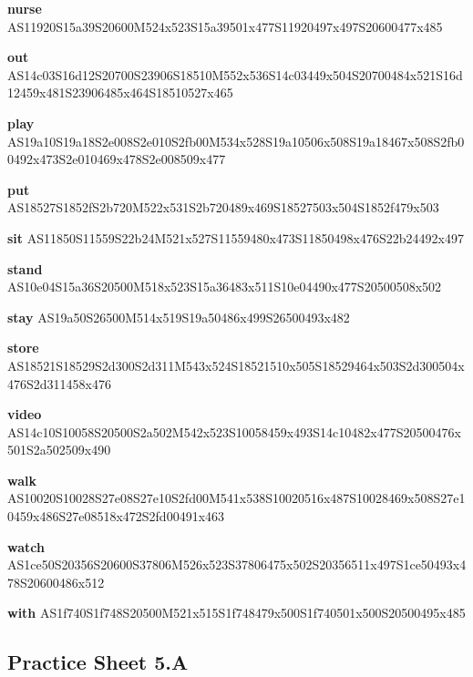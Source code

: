 \documentclass{article}
\begin{document}
\begin{glossary}
\textbf{nurse}\\
AS11920S15a39S20600M524x523S15a39501x477S11920497x497S20600477x485

\textbf{out}\\
AS14c03S16d12S20700S23906S18510M552x536S14c03449x504S20700484x521S16d12459x481S23906485x464S18510527x465

\textbf{play}\\
AS19a10S19a18S2e008S2e010S2fb00M534x528S19a10506x508S19a18467x508S2fb00492x473S2e010469x478S2e008509x477

\textbf{put}\\
AS18527S1852fS2b720M522x531S2b720489x469S18527503x504S1852f479x503

\textbf{sit}
AS11850S11559S22b24M521x527S11559480x473S11850498x476S22b24492x497

\textbf{stand}
AS10e04S15a36S20500M518x523S15a36483x511S10e04490x477S20500508x502

\textbf{stay}
AS19a50S26500M514x519S19a50486x499S26500493x482

\textbf{store}
AS18521S18529S2d300S2d311M543x524S18521510x505S18529464x503S2d300504x476S2d311458x476

\textbf{video}
AS14c10S10058S20500S2a502M542x523S10058459x493S14c10482x477S20500476x501S2a502509x490

\textbf{walk}
AS10020S10028S27e08S27e10S2fd00M541x538S10020516x487S10028469x508S27e10459x486S27e08518x472S2fd00491x463

\textbf{watch}
AS1ce50S20356S20600S37806M526x523S37806475x502S20356511x497S1ce50493x478S20600486x512

\textbf{with}
AS1f740S1f748S20500M521x515S1f748479x500S1f740501x500S20500495x485

\end{glossary}

\subsection{Practice Sheet 5.A}
\end{document}
